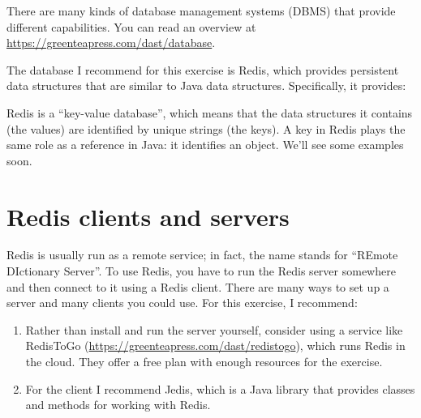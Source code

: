 \documentclass[12pt]{book}
\theoremstyle{exercise}
\newcommand{\java}{\verb}%}
\begin{document}

There are many kinds of database management systems (DBMS) that provide
different capabilities. You can read an overview at
\url{https://greenteapress.com/dast/database}.


The database I recommend for this exercise is Redis, which provides
persistent data structures that are similar to Java data structures.
Specifically, it provides:


Redis is a ``key-value database'', which means that the data structures
it contains (the values) are identified by unique strings (the keys). A
key in Redis plays the same role as a reference in Java: it identifies
an object. We'll see some examples soon.



\section{Redis clients and servers}
\label{redis-clients-and-servers}


Redis is usually run as a remote service; in fact, the name stands for
``REmote DIctionary Server''. To use Redis, you have to run the Redis
server somewhere and then connect to it using a Redis client. There are
many ways to set up a server and many clients you could use. For this
exercise, I recommend:

\begin{enumerate}

\item
  Rather than install and run the server yourself, consider using a
  service like RedisToGo (\url{https://greenteapress.com/dast/redistogo}), which runs
  Redis in the cloud. They offer a free plan with enough resources for
  the exercise.

\item
  For the client I recommend Jedis, which is a Java library that
  provides classes and methods for working with Redis.

\end{enumerate}
\end{document}
